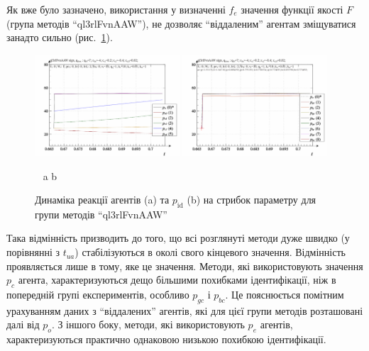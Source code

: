 Як вже було зазначено, використання у визначенні
$ f_e $ значення функції якості
$ F $ (група методів ``ql3rlFvnAAW''), не дозволяє ``віддаленим'' агентам
зміщуватися занадто сильно (рис.~\ref{atu:f:ql3rlFvnAAW_sign}).

\begin{figure}[htb!]
  \begin{center}
    \includegraphics[width=0.48\textwidth]{p/sign/qls-p_t_pi_m_ql3rlFvnAAW_sign.png}
    \hfill
    \includegraphics[width=0.48\textwidth]{p/sign/qls-p_t_p_m_ql3rlFvnAAW_sign.png}
  \end{center}
  \vspace{-1.0ex}
  \begin{center}
    ~ \hfill a \hfill\hfill b  \hfill ~
  \end{center}
  \vspace{-1.5ex}
  \caption{Динаміка реакції агентів (a) та $p_\mathrm{id}$ (b) на стрибок параметру для групи методів ``ql3rlFvnAAW''}
  \label{atu:f:ql3rlFvnAAW_sign}
\end{figure}

Така відмінність призводить до того, що всі розглянуті методи
дуже швидко (у порівнянні з $ t_{ua} $) стабілізуються в околі свого кінцевого
значення. Відмінність проявляється лише в тому, яке це
значення. Методи, які використовують значення
$ p_c $ агента, характеризуються дещо більшими похибками
ідентифікації, ніж в попередній групі експериментів, особливо
$ p_{gc} $ і
$ p_{bc} $. Це пояснюється помітним урахуванням даних з ``віддалених''
агентів, які для цієї групи методів розташовані далі від
$ p_o $. З іншого боку, методи, які використовують
$ p_e $ агентів, характеризуються практично однаковою низькою
похибкою ідентифікації.


